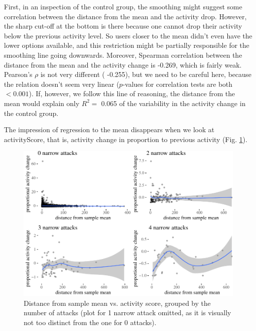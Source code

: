 \documentclass[10pt,]{scrartcl}
\begin{document}
First, in an inspection of the control group, the smoothing might
suggest some correlation between the distance from the mean and the
activity drop. However, the sharp cut-off at the bottom is there because
one cannot drop their activity below the previous activity level. So
users closer to the mean didn't even have the lower options available,
and this restriction might be partially responsible for the smoothing
line going downwards. Moreover, Spearman correlation between the
distance from the mean and the activity change is -0.269, which is
fairly weak. Pearson's \(\rho\) is not very different ( -0.255), but we
need to be careful here, because the relation doesn't seem very linear
(\(p\)-values for correlation tests are both \(<0.001\)). If, however,
we follow this line of reasoning, the distance from the mean would
explain only \(R^2 =\) 0.065 of the variability in the activity change
in the control group.

The impression of regression to the mean disappears when we look at
\textsf{activityScore}, that is, activity change in proportion to
previous activity (Fig. \ref{fig:regression2}).

\begin{figure}

\begin{center}\includegraphics[width=1\linewidth]{redditAnalysisWalkthrough_files/figure-latex/unnamed-chunk-106-1} \end{center}
\caption{Distance from sample mean vs. activity score, grouped by the number of attacks (plot for 1 narrow attack omitted, as it is visually not too distinct from the one for 0 attacks).}
\label{fig:regression2}
\end{figure}
\end{document}
